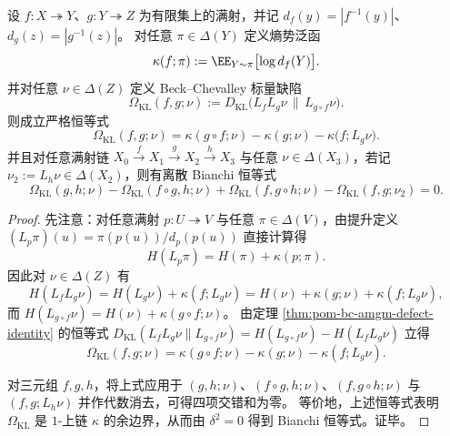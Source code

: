 \begin{theorem}\label{thm:pom-bc-information-stokes-coboundary}
设 \(f:X\twoheadrightarrow Y\)、\(g:Y\twoheadrightarrow Z\) 为有限集上的满射，并记 \(d_f(y)=|f^{-1}(y)|\)、\(d_g(z)=|g^{-1}(z)|\)。
对任意 \(\pi\in\Delta(Y)\) 定义熵势泛函
\[
\kappa(f;\pi):=\EE_{Y\sim \pi}\bigl[\log d_f(Y)\bigr].
\]
并对任意 \(\nu\in\Delta(Z)\) 定义 Beck--Chevalley 标量缺陷
\[
\Omega_{\mathrm{KL}}(f,g;\nu):=
D_{\mathrm{KL}}\!\bigl(L_fL_g\nu\,\|\,L_{g\circ f}\nu\bigr).
\]
则成立严格恒等式
\[
\boxed{\;
\Omega_{\mathrm{KL}}(f,g;\nu)
=\kappa(g\circ f;\nu)-\kappa(g;\nu)-\kappa\!\bigl(f;L_g\nu\bigr).\;}
\]
并且对任意满射链
\(
X_0\xrightarrow{f}X_1\xrightarrow{g}X_2\xrightarrow{h}X_3
\)
与任意 \(\nu\in\Delta(X_3)\)，若记 \(\nu_2:=L_h\nu\in\Delta(X_2)\)，则有离散 Bianchi 恒等式
\[
\boxed{\;
\Omega_{\mathrm{KL}}(g,h;\nu)
-\Omega_{\mathrm{KL}}(f\circ g,h;\nu)
+\Omega_{\mathrm{KL}}(f,g\circ h;\nu)
-\Omega_{\mathrm{KL}}(f,g;\nu_2)=0.\;}
\]
\end{theorem}
\begin{proof}
先注意：对任意满射 \(p:U\twoheadrightarrow V\) 与任意 \(\pi\in\Delta(V)\)，由提升定义
\(
(L_p\pi)(u)=\pi(p(u))/d_p(p(u))
\)
直接计算得
\[
H(L_p\pi)=H(\pi)+\kappa(p;\pi).
\]
因此对 \(\nu\in\Delta(Z)\) 有
\[
H(L_fL_g\nu)=H(L_g\nu)+\kappa(f;L_g\nu)=H(\nu)+\kappa(g;\nu)+\kappa(f;L_g\nu),
\]
而
\(
H(L_{g\circ f}\nu)=H(\nu)+\kappa(g\circ f;\nu)
\)。
由定理 \ref{thm:pom-bc-amgm-defect-identity} 的恒等式
\(
D_{\mathrm{KL}}(L_fL_g\nu\|L_{g\circ f}\nu)=H(L_{g\circ f}\nu)-H(L_fL_g\nu)
\)
立得
\[
\Omega_{\mathrm{KL}}(f,g;\nu)
=\kappa(g\circ f;\nu)-\kappa(g;\nu)-\kappa(f;L_g\nu).
\]
\par
对三元组 \(f,g,h\)，将上式应用于 \((g,h;\nu)\)、\((f\circ g,h;\nu)\)、\((f,g\circ h;\nu)\) 与 \((f,g;L_h\nu)\) 并作代数消去，可得四项交错和为零。
等价地，上述恒等式表明 \(\Omega_{\mathrm{KL}}\) 是 \(1\)-上链 \(\kappa\) 的余边界，从而由 \(\delta^2=0\) 得到 Bianchi 恒等式。证毕。
\end{proof}

\endinput
